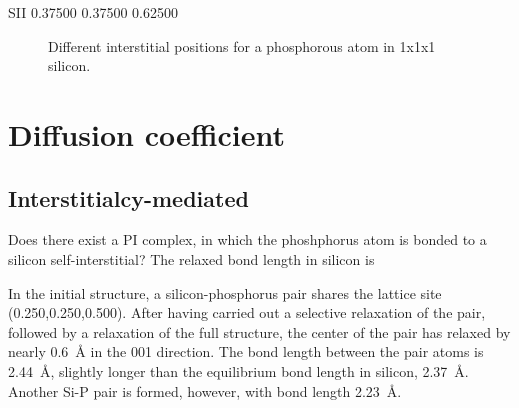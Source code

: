 \documentclass[11pt,bibliography=totoc,index=totoc]{scrbook}   %
\begin{document}
SII	 0.37500	 0.37500	 0.62500

\begin{figure}[htbp]
  \centering
  \caption{Different interstitial positions for a phosphorous atom in 1x1x1 silicon.}
\end{figure}

\section{Diffusion coefficient}

\subsection{Interstitialcy-mediated}

Does there exist a PI complex, in which the phoshphorus atom is bonded to a silicon self-interstitial?
The relaxed bond length in silicon is 

In the initial structure, a silicon-phosphorus pair shares the lattice site (0.250,0.250,0.500).
After having carried out a selective relaxation of the pair, followed by a relaxation of the full structure,
the center of the pair has relaxed by nearly \SI{0.6}{\angstrom} in the 001 direction. 
The bond length between the pair atoms is \SI{2.44}{\angstrom}, slightly longer than the 
equilibrium bond length in silicon, \SI{2.37}{\angstrom}. Another Si-P pair is formed, however, 
with bond length \SI{2.23}{\angstrom}.
\end{document}

